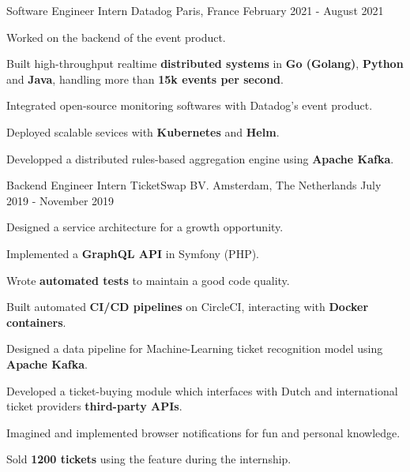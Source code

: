 

\begin{cventries}

  \cventry
    {Software Engineer Intern} %
    {Datadog} %
    {Paris, France} %
    {February 2021 - August 2021} %
    {
      \begin{cvitems} %
        \item {Worked on the backend of the event product.}
        \item {Built high-throughput realtime \textbf{distributed systems} in \textbf{Go (Golang)}, \textbf{Python} and \textbf{Java}, handling more than \textbf{15k events per second}.}
        \item {Integrated open-source monitoring softwares with Datadog's event product.}
        \item {Deployed scalable sevices with \textbf{Kubernetes} and \textbf{Helm}.}
        \item {Developped a distributed rules-based aggregation engine using \textbf{Apache Kafka}.}
      \end{cvitems}
    }


  \cventry
    {Backend Engineer Intern} %
    {TicketSwap BV.} %
    {Amsterdam, The Netherlands} %
    {July 2019 - November 2019} %
    {
      \begin{cvitems} %
        \item {Designed a service architecture for a growth opportunity.}
        \item {Implemented a \textbf{GraphQL API} in Symfony (PHP).}
        \item {Wrote \textbf{automated tests} to maintain a good code quality.}
        \item {Built automated \textbf{CI/CD pipelines} on CircleCI, interacting with \textbf{Docker containers}.}
        \item {Designed a data pipeline for Machine-Learning ticket recognition model using \textbf{Apache Kafka}.}
        \item {Developed a ticket-buying module which interfaces with Dutch and international ticket providers \textbf{third-party APIs}.}
        \item {Imagined and implemented browser notifications for fun and personal knowledge.}
        \item {Sold \textbf{1200 tickets} using the feature during the internship.}
      \end{cvitems}
    }

\end{cventries}
